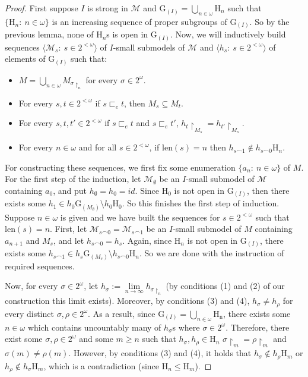 \documentclass[11pt]{article}
\theoremstyle{plain}
\theoremstyle{definition}
\newcommand{\M}{\mathcal{M}}
\newcommand{\G}{\mathrm{G}}
\begin{document}
\begin{proof}
	First suppose $I $ is strong in $\M$ and $\G_{(I)}=\bigcup_{n\in\omega}\mathrm{H}_{n}$ such that $\{\mathrm{H}_{n}: \ n\in\omega\}$ is an increasing sequence of proper subgroups of $\G_{(I)}$. So by the previous lemma, none of $\mathrm{H}_{n}$s is open in $\G_{(I)}$. Now, we will inductively build sequences $\langle \M_{s}: \ s\in 2^{<\omega}\rangle$ of  $I$-small submodels of $\M$ and $\langle h_{s}: \ s\in 2^{<\omega} \rangle$ of elements of $\G_{(I)}$ such that:
	\begin{itemize}
	\item[(1)] $M=\bigcup_{n\in\omega} M_{\sigma\upharpoonright_{n}}$ for every $\sigma\in 2^{\omega}$.
	\item[(2)] For every $s,t\in 2^{<\omega}$ if $s\sqsubset_{e}t$, then $M_{s}\subseteq M_{t}$.
	\item[(3)] For every $s,t,t'\in 2^{<\omega}$ if $s\sqsubset_{e}t$ and $s\sqsubset_{e}t'$, $h_{t}\upharpoonright_{M_{s}}=h_{t'}\upharpoonright_{M_{s}}$.
	\item[(4)] For every $n\in\omega$ and for all $s\in 2^{<\omega}$, if $\mathrm{len}(s)=n$ then $h_{s\frown 1}\notin h_{s\frown 0}\mathrm{H}_{n}$.
	\end{itemize}
	For constructing these sequences, we first fix some enumeration $\{a_{n}: \ n\in\omega\}$ of $M$. For the first step of the induction, let $\M_{\emptyset}$ be an $I$-small submodel of $\M$ containing $a_{0}$, and put $h_{\emptyset}=h_{0}=id$. Since $\mathrm{H}_{0}$ is not open in $\G_{(I)}$, then there exists some $h_{1}\in h_{0}\G_{(M_{\emptyset})}\setminus h_{0}\mathrm{H}_{0}$. So this finishes the first step of induction. Suppose $n\in\omega$ is given and we have built the sequences for  $s\in 2^{<\omega} $ such that $\mathrm{len}(s)= n$. First, let $\M_{s\frown 0}=\M_{s\frown 1}$ be an $I $-small submodel of $M$ containing $a_{n+1}$ and $M_{s}$, and let $h_{s\frown 0}=h_{s}$. Again, since $\mathrm{H}_{n}$ is not open in $\G_{(I)}$, there exists some $h_{s\frown 1}\in h_{s}\G_{(M_{s})}\setminus h_{s\frown 0}\mathrm{H}_{n}$. So we are done with the instruction of required sequences.
	
	
	Now, for every $\sigma\in 2^{\omega}$, let $h_{\sigma}:=\lim\limits_{n\rightarrow\infty} h_{\sigma\upharpoonright_{n}}	$ (by conditions (1) and (2) of our construction this limit exists). Moreover, by conditions (3) and (4), $h_{\sigma}\neq h_{\rho}$ for every distinct $\sigma,\rho\in 2^{\omega}$. As a result, since $\G_{(I)}=\bigcup_{n\in\omega}\mathrm{H_{n}}$, there exists some $n\in \omega$ which contains uncountably many of $h_{\sigma}$s where $\sigma\in 2^{\omega}$. Therefore, there exist some $ \sigma,\rho\in 2^{\omega}$ and some $m\geq n$ such that $h_{\sigma},h_{\rho}\in \mathrm{H}_{n}$ $\sigma\upharpoonright_{m}=\rho\upharpoonright_{m}$ and $\sigma(m)\neq\rho(m)$. However,  by conditions (3) and (4), it holds that $h_{\sigma}\notin h_{\rho}\mathrm{H}_{m}$ or $h_{\rho}\notin h_{\sigma}\mathrm{H}_{m}$, which is a contradiction (since $\mathrm{H}_{n}\leq\mathrm{H}_{m}$).



\end{proof}
\end{document}

